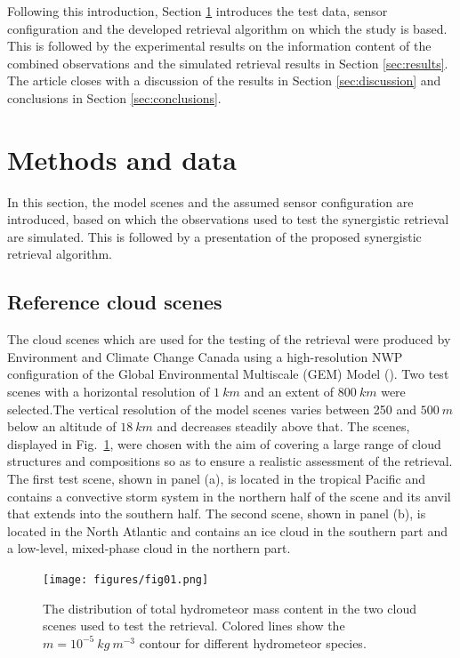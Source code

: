 \documentclass[journal abbreviation, manuscript]{copernicus}
\begin{document}
Following this introduction, Section \ref{sec:methods_and_data} introduces the
test data, sensor configuration and the developed retrieval algorithm on which
the study is based. This is followed by the experimental results on the
information content of the combined observations and the simulated retrieval
results in Section \ref{sec:results}. The article closes with a discussion of
the results in Section \ref{sec:discussion} and conclusions in Section
\ref{sec:conclusions}.


\section{Methods and data}
\label{sec:methods_and_data}

In this section, the model scenes and the assumed sensor configuration are
introduced, based on which the observations used to test the synergistic
retrieval are simulated. This is followed by a presentation of the proposed
synergistic retrieval algorithm.

\subsection{Reference cloud scenes}

The cloud scenes which are used for the testing of the retrieval were produced
by Environment and Climate Change Canada using a high-resolution NWP
configuration of the Global Environmental Multiscale (GEM) Model
(\cite{cote98}). Two test scenes with a horizontal resolution of $1\ \unit{km}$
and an extent of $800\ \unit{km}$ were selected.The vertical resolution of the
model scenes varies between 250 and $500\ \unit{m}$ below an altitude of
$18\ \unit{km}$ and decreases steadily above that. The scenes, displayed in
Fig.~\ref{fig:overview}, were chosen with the aim of covering a large range of
cloud structures and compositions so as to ensure a realistic assessment of the
retrieval. The first test scene, shown in panel (a), is located in the tropical
Pacific and contains a convective storm system in the northern half of the scene
and its anvil that extends into the southern half. The second scene, shown in
panel (b), is located in the North Atlantic and contains an ice cloud in the
southern part and a low-level, mixed-phase cloud in the northern part.

\begin{figure}[h!]
\centering
\texttt{[image: figures/fig01.png]}
\caption{The distribution of total hydrometeor mass content in the two
cloud scenes used to test the retrieval. Colored lines show the
 $m = 10^{-5}\  \unit{kg\ m^{-3}}$ contour for different
 hydrometeor species.}
\label{fig:overview}
\end{figure}
\end{document}

